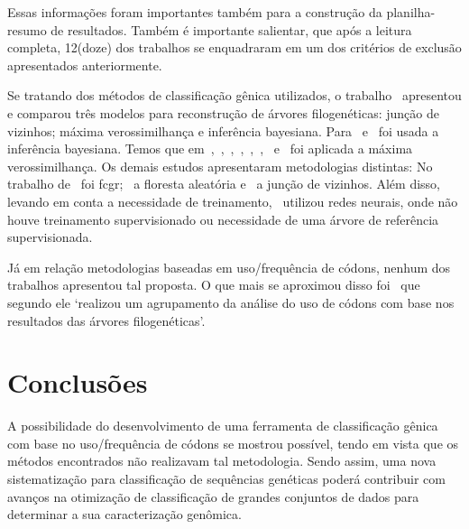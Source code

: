 \documentclass[12pt]{article}
\begin{document}
Essas informações foram importantes também para a construção da planilha-resumo de resultados. Também é importante salientar, que após a leitura completa, 12(doze) dos trabalhos se enquadraram em um dos critérios de exclusão apresentados anteriormente.

Se tratando dos métodos de classificação gênica utilizados, o trabalho~\cite{dimitrov_updated_2019} apresentou e comparou três modelos para reconstrução de árvores filogenéticas: junção de vizinhos; máxima verossimilhança e inferência bayesiana.
Para~\cite{yin_systematic_2019} e~\cite{bedoya-pilozo_molecular_epidemiology_2018} foi usada a inferência bayesiana. Temos que em~\cite{fall_genetic_diversity_2021},~\cite{behl_threat_2022},~\cite{shabbir_comprehensive_2020},~\cite{hudu_hepatitis_2018},~\cite{sallard_tracing_2021},~\cite{paez-espino_diversity_evolution_2019},~\cite{tang_evolutionary_2021} e~\cite{cho_analysis_2022} foi aplicada a máxima verossimilhança.
Os demais estudos apresentaram metodologias distintas: No trabalho de~\cite{lichtblau_alignment-free_2019} foi \gls{fcgr};~\cite{kim_ngs_2022} a floresta aleatória e~\cite{potdar_phylogenetic_2021} a junção de vizinhos.
Além disso, levando em conta a necessidade de treinamento,~\cite{lichtblau_alignment-free_2019} utilizou redes neurais, onde não houve treinamento supervisionado ou necessidade de uma árvore de referência supervisionada.

Já em relação metodologias baseadas em uso/frequência de códons, nenhum dos trabalhos apresentou tal proposta. O que mais se aproximou disso foi~\cite{cho_analysis_2022} que segundo ele `realizou um agrupamento da análise do uso de códons com base nos resultados das árvores filogenéticas'.

\section{Conclusões}

A possibilidade do desenvolvimento de uma ferramenta de classificação gênica com base no uso/frequência de códons se mostrou possível, tendo em vista que os métodos encontrados não realizavam tal metodologia. Sendo assim, uma nova sistematização para classificação de sequências genéticas poderá contribuir com avanços na otimização de classificação de grandes conjuntos de dados para determinar a sua caracterização genômica.



\end{document}
